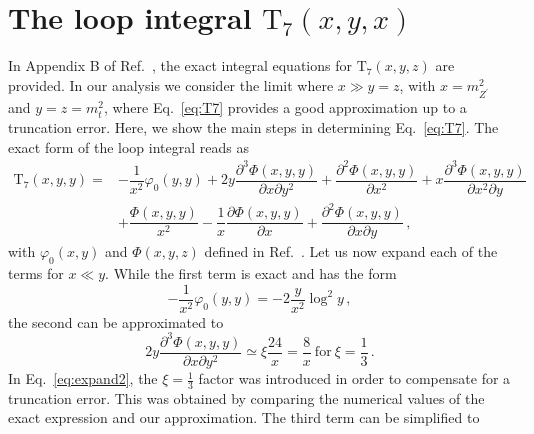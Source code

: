 \documentclass[10pt]{report}
\newcommand{\ro}[1]{\textrm{#1}}
\renewcommand{\(}{\left(}
\renewcommand{\)}{\right)}
\renewcommand{\[}{\left[}
\renewcommand{\]}{\right]}
\newcommand{\del}{\partial}
\begin{document}










\newpage



\appendix
\chapter{The loop integral \texorpdfstring{$\ro{T}_7(x,y,x)$}{} }
\label{app:T7}

In Appendix B of Ref.~\cite{Feng:2009gn}, the exact integral equations for $\ro{T}_7\left(x,y,z\right)$ are provided. 
In our analysis we consider the limit where $x \gg y = z$, with $x = m_{Z^\prime}^2$ and $y = z = m_t^2$, 
where Eq.~\eqref{eq:T7} provides a good approximation up to a truncation error. Here, we show the main steps 
in determining Eq.~\eqref{eq:T7}. The exact form of the loop integral reads as
\begin{equation}
\begin{aligned}
    \ro{T}_7\left(x,y,y\right) =& -\dfrac{1}{x^2} \varphi_0\left(y,y\right) + 2 y \dfrac{\del^3 \Phi(x,y,y)}{\del x \del y^2} + \dfrac{\del^2 \Phi(x,y,y)}{\del x^2} + x \dfrac{\del^3 \Phi(x,y,y)}{\del x^2 \del y} \\
    & + \dfrac{\Phi(x,y,y)}{x^2}
    -\dfrac{1}{x} \dfrac{\del \Phi(x,y,y)}{\del x}
    + \dfrac{\del^2 \Phi(x,y,y)}{\del x \del y} \,,
\end{aligned}    
\label{eq:T7-Integrals}
\end{equation}
with $\varphi_0 (x,y)$ and $\Phi(x,y,z)$ defined in Ref.~\cite{Feng:2009gn}. Let us now expand 
each of the terms for $x \ll y$. While the first term is exact and has the form
\begin{equation}
    -\dfrac{1}{x^2} \varphi_0\left(y,y\right) = -2 \dfrac{y}{x^2} \log^2 y \,,
    \label{eq:expand1}
\end{equation}
the second can be approximated to
\begin{equation}
    2 y \dfrac{\del^3 \Phi(x,y,y)}{\del x \del y^2} \simeq \xi \dfrac{24}{x} = \dfrac{8}{x} ~\textrm{for}~ \xi = \dfrac{1}{3}\,.
    \label{eq:expand2}
\end{equation}
In Eq.~\eqref{eq:expand2}, the $\xi = \tfrac{1}{3}$ factor was introduced in order to compensate for a truncation error. This was obtained by comparing the numerical values of the exact expression and our approximation. The third term can be simplified to
\end{document}
